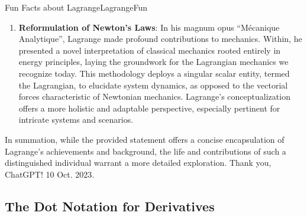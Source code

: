\begin{funColor}{Fun Facts about Lagrange}{LagrangeFun}
\begin{enumerate}
    \item \textbf{Reformulation of Newton's Laws}: In his magnum opus ``Mécanique Analytique'', Lagrange made profound contributions to mechanics. Within, he presented a novel interpretation of classical mechanics rooted entirely in energy principles, laying the groundwork for the Lagrangian mechanics we recognize today. This methodology deploys a singular scalar entity, termed the Lagrangian, to elucidate system dynamics, as opposed to the vectorial forces characteristic of Newtonian mechanics. Lagrange's conceptualization offers a more holistic and adaptable perspective, especially pertinent for intricate systems and scenarios.
\end{enumerate}

In summation, while the provided statement offers a concise encapsulation of Lagrange's achievements and background, the life and contributions of such a distinguished individual warrant a more detailed exploration. Thank you, ChatGPT!
10 Oct. 2023.
\end{funColor}


\subsection{The Dot Notation for Derivatives}

